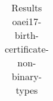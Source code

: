 \begin{table}[htb]
{\begin{tabular}[tb]{llllllllllllllllllllllllllllllllllllllll}
\end{tabular}

}

\caption{Results oaei17-birth-certificate-non-binary-types}

\label{tbl:results}

\end{table}